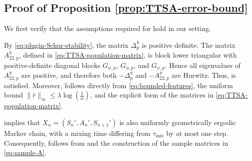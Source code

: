 \documentclass{article}
\theoremstyle{definition}
\theoremstyle{remark}
\theoremstyle{plain}
\newcommand{\tmix}{\tau_{\mathrm{mix}}}
\newcommand{\dsieve}{p}
\numberwithin{equation}{section}
\begin{document}
\subsection{Proof of Proposition \ref{prop:TTSA-error-bound}}
\label{app:ttsa_rate}

We first verify that the assumptions required for  hold in our setting. 

By \eqref{eq:plugin-Schur-stability}, the matrix \(\Delta_\dsieve^{\widehat\pi}\) is positive definite. The matrix \(A_{22,\dsieve}^{\widehat\pi}\), defined in \eqref{eq:TTSA-population-matrix}, is block lower triangular with positive-definite diagonal blocks \(G_{\psi,\dsieve}\), \(G_{\phi,\dsieve}\), and \(G_{\psi,\dsieve}\). Hence all eigenvalues of \(A_{22,\dsieve}^{\widehat\pi}\) are positive, and therefore both \(-\Delta_\dsieve^{\widehat\pi}\) and \(-A_{22,\dsieve}^{\widehat\pi}\) are Hurwitz. Thus,  is satisfied. Moreover,  follows directly from \eqref{eq:bounded-features}, the uniform bound \(\|\widehat r \|_\infty\le \lambda\log(\frac{1}{\alpha})\), and the explicit form of the matrices in \eqref{eq:TTSA-population-matrix}. 

implies that \( X_n = (S_n', A_n', S_{n+1}')\) is also uniformly geometrically ergodic Markov chain, with
a mixing time differing from \(\tmix\) by at most one step. Consequently,  follows from  and the construction of the sample matrices in \eqref{eq:sample-A}.
\end{document}
